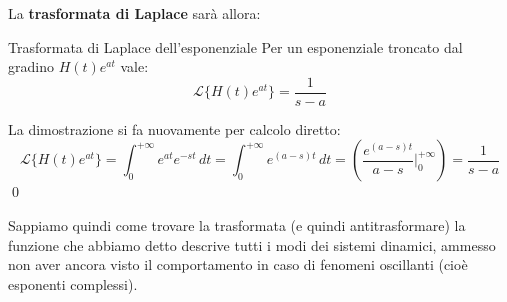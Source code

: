 \documentclass[a4paper,11pt]{article}
\begin{document}
		La \textbf{trasformata di Laplace} sarà allora:
		\begin{theorem}{Trasformata di Laplace dell'esponenziale}
			Per un esponenziale troncato dal gradino $H(t)e^{at}$ vale:
		$$
		\mathcal{L} \{ H(t) e^{at} \} = \frac{1}{s - a}
		$$
		\end{theorem}
		La dimostrazione si fa nuovamente per calcolo diretto:
		$$
		\mathcal{L} \{ H(t) e^{at} \} = \int_0^{+ \infty} e^{at} e^{-st} \, dt = \int_0^{+\infty} e^{(a - s)t} \, dt = \left( \frac{e^{(a - s)t}}{a - s} \Bigg|^{+\infty}_0 \right) = \frac{1}{s - a}
		$$
		\qed

		Sappiamo quindi come trovare la trasformata (e quindi antitrasformare) la funzione che abbiamo detto descrive tutti i modi dei sistemi dinamici, ammesso non aver ancora visto il comportamento in caso di fenomeni oscillanti (cioè esponenti complessi).
\end{document}
